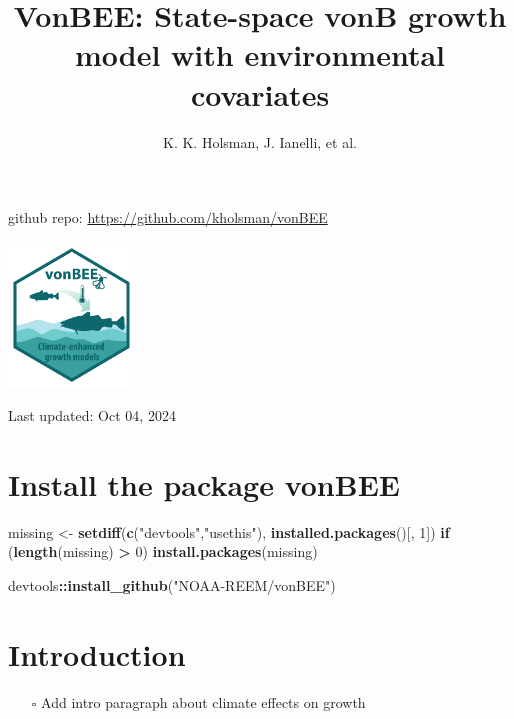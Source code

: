 \documentclass[
]{article}
\title{VonBEE: State-space vonB growth model with environmental
covariates}
\author{K. K. Holsman, J. Ianelli, et al.}
\date{}
\newenvironment{Shaded}{\begin{snugshade}}{\end{snugshade}}
\newcommand{\ControlFlowTok}[1]{\textcolor[rgb]{0.13,0.29,0.53}{\textbf{#1}}}
\newcommand{\DecValTok}[1]{\textcolor[rgb]{0.00,0.00,0.81}{#1}}
\newcommand{\FunctionTok}[1]{\textcolor[rgb]{0.13,0.29,0.53}{\textbf{#1}}}
\newcommand{\NormalTok}[1]{#1}
\newcommand{\OtherTok}[1]{\textcolor[rgb]{0.56,0.35,0.01}{#1}}
\newcommand{\SpecialCharTok}[1]{\textcolor[rgb]{0.81,0.36,0.00}{\textbf{#1}}}
\newcommand{\StringTok}[1]{\textcolor[rgb]{0.31,0.60,0.02}{#1}}
\providecommand{\tightlist}{%
  \setlength{\itemsep}{0pt}\setlength{\parskip}{0pt}}
\begin{document}
\maketitle

{
\setcounter{tocdepth}{2}
\tableofcontents
}
github repo: \url{https://github.com/kholsman/vonBEE}

\includegraphics[width=0.25\textwidth,height=\textheight]{Figs/vonBEE.png}

Last updated: Oct 04, 2024

\section{Install the package vonBEE}\label{install-the-package-vonbee}

\begin{Shaded}
\begin{Highlighting}[]
\NormalTok{  missing }\OtherTok{\textless{}{-}} \FunctionTok{setdiff}\NormalTok{(}\FunctionTok{c}\NormalTok{(}\StringTok{"devtools"}\NormalTok{,}\StringTok{"usethis"}\NormalTok{),   }\FunctionTok{installed.packages}\NormalTok{()[, }\DecValTok{1}\NormalTok{])}
  \ControlFlowTok{if}\NormalTok{ (}\FunctionTok{length}\NormalTok{(missing) }\SpecialCharTok{\textgreater{}} \DecValTok{0}\NormalTok{) }
    \FunctionTok{install.packages}\NormalTok{(missing)}

\NormalTok{  devtools}\SpecialCharTok{::}\FunctionTok{install\_github}\NormalTok{(}\StringTok{"NOAA{-}REEM/vonBEE"}\NormalTok{)}
\end{Highlighting}
\end{Shaded}

\section{Introduction}\label{introduction}

\begin{itemize}
\tightlist
\item[$\square$]
  Add intro paragraph about climate effects on growth
\end{itemize}
\end{document}
